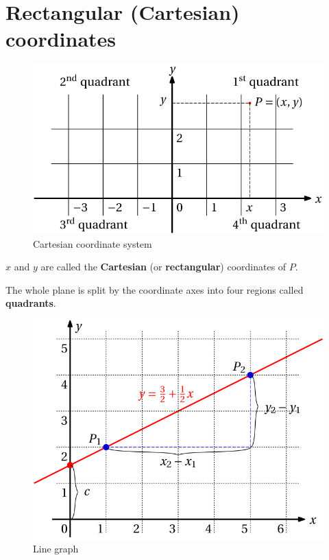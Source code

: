\documentclass[
  12pt,
  oneside]{book}
\theoremstyle{definition}
\theoremstyle{definition}
\theoremstyle{definition}
\theoremstyle{definition}
\theoremstyle{remark}
\begin{document}
\hypertarget{rectangular-cartesian-coordinates}{%
\chapter{Rectangular (Cartesian) coordinates}\label{rectangular-cartesian-coordinates}}

\begin{figure}

{\centering \includegraphics{t16-cart} 

}

\caption{Cartesian coordinate system}\label{fig:unnamed-chunk-8}
\end{figure}

\(x\) and \(y\) are called the \textbf{Cartesian} (or \textbf{rectangular}) coordinates of \(P\).

The whole plane is split by the coordinate axes into four regions called \textbf{quadrants}.

\begin{figure}

{\centering \includegraphics{t16-line} 

}

\caption{Line graph}\label{fig:unnamed-chunk-9}
\end{figure}
\end{document}
